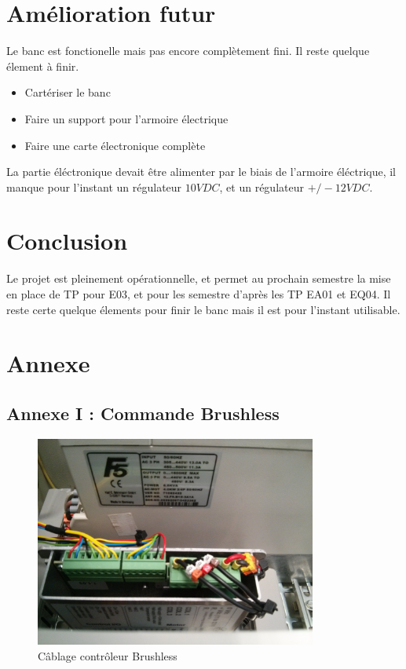 \documentclass[11pt]{article}
\begin{document}

\section{Amélioration futur}

Le banc est fonctionelle mais pas encore complètement fini. Il reste quelque élement à finir.

\begin{itemize}
	\item Cartériser le banc
	\item Faire un support pour l'armoire électrique
	\item Faire une carte électronique complète
\end{itemize}

La partie éléctronique devait être alimenter par le biais de l'armoire éléctrique, il manque pour l'instant un régulateur $10VDC$, et un régulateur $+/- 12VDC$.

\newpage
\section{Conclusion}

Le projet est pleinement opérationnelle, et permet au prochain semestre la mise en place de TP pour E03, et pour les semestre d'après les TP EA01 et EQ04. Il reste certe quelque élements pour finir le banc mais il est pour l'instant utilisable.


\newpage
\section{Annexe}

\subsection{Annexe I : Commande Brushless}

\begin{figure}[!h]
    \centering
    \includegraphics[width=350px]{IMG_20160629_193653.jpg}
    \caption{Câblage contrôleur Brushless}
\end{figure}
\end{document}
